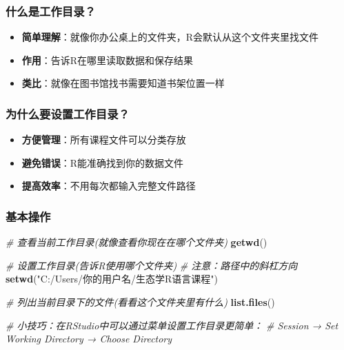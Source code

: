 \documentclass[
  twoside]{book}
\newenvironment{Shaded}{\begin{snugshade}}{\end{snugshade}}
\newcommand{\CommentTok}[1]{\textcolor[rgb]{0.56,0.35,0.01}{\textit{#1}}}
\newcommand{\FunctionTok}[1]{\textcolor[rgb]{0.13,0.29,0.53}{\textbf{#1}}}
\newcommand{\NormalTok}[1]{#1}
\newcommand{\StringTok}[1]{\textcolor[rgb]{0.31,0.60,0.02}{#1}}
\providecommand{\tightlist}{%
  \setlength{\itemsep}{0pt}\setlength{\parskip}{0pt}}
\begin{document}
\hypertarget{ux4ec0ux4e48ux662fux5de5ux4f5cux76eeux5f55}{%
\subsubsection{什么是工作目录？}\label{ux4ec0ux4e48ux662fux5de5ux4f5cux76eeux5f55}}

\begin{itemize}
\tightlist
\item
  \textbf{简单理解}：就像你办公桌上的文件夹，R会默认从这个文件夹里找文件
\item
  \textbf{作用}：告诉R在哪里读取数据和保存结果
\item
  \textbf{类比}：就像在图书馆找书需要知道书架位置一样
\end{itemize}

\hypertarget{ux4e3aux4ec0ux4e48ux8981ux8bbeux7f6eux5de5ux4f5cux76eeux5f55}{%
\subsubsection{为什么要设置工作目录？}\label{ux4e3aux4ec0ux4e48ux8981ux8bbeux7f6eux5de5ux4f5cux76eeux5f55}}

\begin{itemize}
\tightlist
\item
  \textbf{方便管理}：所有课程文件可以分类存放
\item
  \textbf{避免错误}：R能准确找到你的数据文件
\item
  \textbf{提高效率}：不用每次都输入完整文件路径
\end{itemize}

\hypertarget{ux57faux672cux64cdux4f5c}{%
\subsubsection{基本操作}\label{ux57faux672cux64cdux4f5c}}

\begin{Shaded}
\begin{Highlighting}[]
\CommentTok{\# 查看当前工作目录(就像查看你现在在哪个文件夹)}
\FunctionTok{getwd}\NormalTok{()}

\CommentTok{\# 设置工作目录(告诉R使用哪个文件夹)}
\CommentTok{\# 注意：路径中的斜杠方向}
\FunctionTok{setwd}\NormalTok{(}\StringTok{"C:/Users/你的用户名/生态学R语言课程"}\NormalTok{) }

\CommentTok{\# 列出当前目录下的文件(看看这个文件夹里有什么)}
\FunctionTok{list.files}\NormalTok{()}

\CommentTok{\# 小技巧：在RStudio中可以通过菜单设置工作目录更简单：}
\CommentTok{\# Session → Set Working Directory → Choose Directory}
\end{Highlighting}
\end{Shaded}
\end{document}
